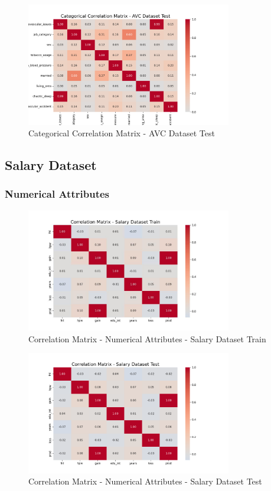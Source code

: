\documentclass[a4paper,12pt]{article}
\begin{document}
\begin{figure}[h!]
    \centering
    \includegraphics[width=0.8\textwidth]{Resources/matrix_categorial_avc_test.png}
    \caption{Categorical Correlation Matrix - AVC Dataset Test}
\end{figure}

\newpage
\subsection{Salary Dataset}
\subsubsection{Numerical Attributes}
\begin{figure}[h!]
    \centering
    \includegraphics[width=0.8\textwidth]{Resources/matrix_salary_train.jpeg}
    \caption{Correlation Matrix - Numerical Attributes - Salary Dataset Train}
\end{figure}

\begin{figure}[h!]
    \centering
    \includegraphics[width=0.8\textwidth]{Resources/matrix_salary_test.png}
    \caption{Correlation Matrix - Numerical Attributes - Salary Dataset Test}
\end{figure}
\end{document}
